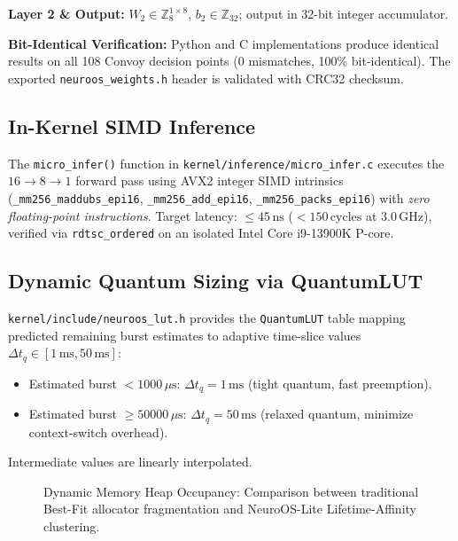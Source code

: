 \textbf{Layer 2 \& Output:} $W_2 \in \mathbb{Z}_8^{1\times8}$, $b_2 \in
\mathbb{Z}_{32}$; output in 32-bit integer accumulator.

\textbf{Bit-Identical Verification:} Python and C implementations produce
identical results on all 108 Convoy decision points (0 mismatches, 100\%
bit-identical). The exported \texttt{neuroos\_weights.h} header is validated
with CRC32 checksum.

\subsection{In-Kernel SIMD Inference}
\label{subsec:simd}

The \texttt{micro\_infer()} function in \texttt{kernel/inference/micro\_infer.c}
executes the $16\to 8\to 1$ forward pass using AVX2 integer SIMD
intrinsics (\texttt{\_mm256\_maddubs\_epi16}, \texttt{\_mm256\_add\_epi16},
\texttt{\_mm256\_packs\_epi16}) with \emph{zero floating-point instructions}.
Target latency: $\le 45\,\text{ns}$ ($<150\,\text{cycles}$ at
$3.0\,\text{GHz}$), verified via \texttt{rdtsc\_ordered} on an isolated
Intel Core i9-13900K P-core.

\subsection{Dynamic Quantum Sizing via QuantumLUT}
\label{subsec:lut}

\texttt{kernel/include/neuroos\_lut.h} provides the \texttt{QuantumLUT} table
mapping predicted remaining burst estimates to adaptive time-slice values
$\Delta t_q \in [1\,\text{ms}, 50\,\text{ms}]$:
\begin{itemize}
  \item Estimated burst $<1000\,\mu\text{s}$: $\Delta t_q = 1\,\text{ms}$ (tight quantum, fast preemption).
  \item Estimated burst $\ge 50000\,\mu\text{s}$: $\Delta t_q = 50\,\text{ms}$ (relaxed quantum, minimize context-switch overhead).
\end{itemize}
Intermediate values are linearly interpolated.

\begin{figure}[t]
  \centering
  \caption{Dynamic Memory Heap Occupancy: Comparison between traditional Best-Fit allocator fragmentation and NeuroOS-Lite Lifetime-Affinity clustering.}
  \label{fig:memory_heatmap}
\end{figure}

